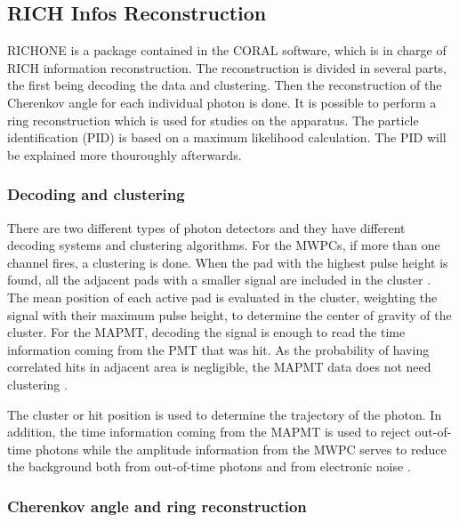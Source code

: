 \subsection{RICH Infos Reconstruction}

RICHONE is a package contained in the CORAL software, which is in charge of RICH information reconstruction. The reconstruction is divided in several parts, the first being decoding the data and clustering. Then the reconstruction of the Cherenkov angle for each individual photon is done. It is possible to perform a ring reconstruction which is used for studies on the apparatus. The particle identification (PID) is based on a maximum likelihood calculation. The PID will be explained more thouroughly afterwards.

\subsubsection*{Decoding and clustering}

There are two different types of photon detectors and they have different decoding systems and clustering algorithms. For the MWPCs, if more than one channel fires, a clustering is done. When the pad with the highest pulse height is found, all the adjacent pads with a smaller signal are included in the cluster \cite{RICHPID}. The mean position of each active pad is evaluated in the cluster, weighting the signal with their maximum pulse height, to determine the center of gravity of the cluster. For the MAPMT, decoding the signal is enough to read the time information coming from the PMT that was hit. As the probability of having correlated hits in adjacent area is negligible, the MAPMT data does not need clustering \cite{RICHElec}.

The cluster or hit position is used to determine the trajectory of the photon. In addition, the time information coming from the MAPMT is used to reject out-of-time photons while the amplitude information from the MWPC serves to reduce the background both from out-of-time photons and from electronic noise \cite{RICHPID}.

\subsubsection*{Cherenkov angle and ring reconstruction}


